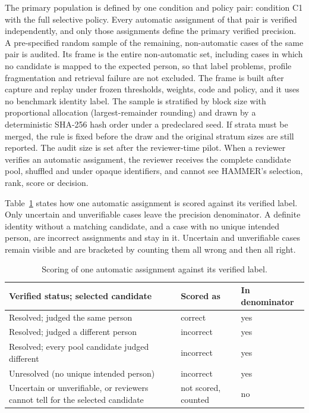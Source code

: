 The primary population is defined by one condition and policy pair: condition C1 with the full selective policy. Every automatic assignment of that pair is verified independently, and only those assignments define the primary verified precision. A pre-specified random sample of the remaining, non-automatic cases of the same pair is audited. Its frame is the entire non-automatic set, including cases in which no candidate is mapped to the expected person, so that label problems, profile fragmentation and retrieval failure are not excluded. The frame is built after capture and replay under frozen thresholds, weights, code and policy, and it uses no benchmark identity label. The sample is stratified by block size with proportional allocation (largest-remainder rounding) and drawn by a deterministic SHA-256 hash order under a predeclared seed. If strata must be merged, the rule is fixed before the draw and the original stratum sizes are still reported. The audit size is set after the reviewer-time pilot. When a reviewer verifies an automatic assignment, the reviewer receives the complete candidate pool, shuffled and under opaque identifiers, and cannot see HAMMER's selection, rank, score or decision.

Table~\ref{tab:scoring} states how one automatic assignment is scored against its verified label. Only uncertain and unverifiable cases leave the precision denominator. A definite identity without a matching candidate, and a case with no unique intended person, are incorrect assignments and stay in it. Uncertain and unverifiable cases remain visible and are bracketed by counting them all wrong and then all right.

\begin{table}[t]
\caption{Scoring of one automatic assignment against its verified label.}
\label{tab:scoring}
\centering
\footnotesize
\renewcommand{\arraystretch}{1.1}
\begin{tabular}{@{}p{}p{}p{}@{}}
\toprule
\textbf{Verified status; selected candidate} & \textbf{Scored as} & \textbf{In denominator} \\
\midrule
Resolved; judged the same person & correct & yes \\
Resolved; judged a different person & incorrect & yes \\
Resolved; every pool candidate judged different & incorrect & yes \\
Unresolved (no unique intended person) & incorrect & yes \\
Uncertain or unverifiable, or reviewers cannot tell for the selected candidate & not scored, counted & no \\
\bottomrule
\end{tabular}
\end{table}

